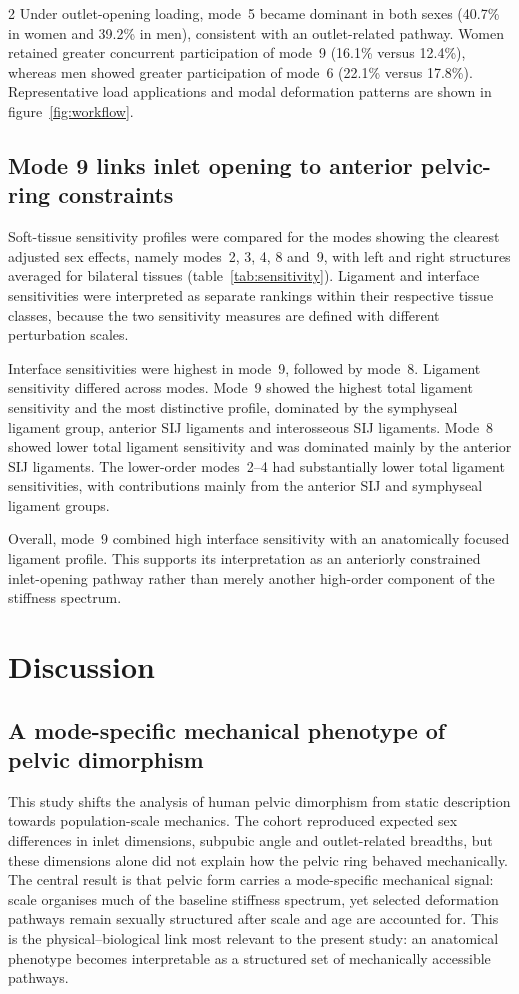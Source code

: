 \documentclass[openacc]{rsproca_new}
\begin{document}
\begin{multicols}{2}
Under outlet-opening loading, mode~5 became dominant in both sexes (40.7\% in women and 39.2\% in men), consistent with an outlet-related pathway. Women retained greater concurrent participation of mode~9 (16.1\% versus 12.4\%), whereas men showed greater participation of mode~6 (22.1\% versus 17.8\%). Representative load applications and modal deformation patterns are shown in figure~\ref{fig:workflow}.

\subsection{Mode 9 links inlet opening to anterior pelvic-ring constraints}

Soft-tissue sensitivity profiles were compared for the modes showing the clearest adjusted sex effects, namely modes~2, 3, 4, 8 and~9, with left and right structures averaged for bilateral tissues (table~\ref{tab:sensitivity}). Ligament and interface sensitivities were interpreted as separate rankings within their respective tissue classes, because the two sensitivity measures are defined with different perturbation scales.

Interface sensitivities were highest in mode~9, followed by mode~8. Ligament sensitivity differed across modes. Mode~9 showed the highest total ligament sensitivity and the most distinctive profile, dominated by the symphyseal ligament group, anterior SIJ ligaments and interosseous SIJ ligaments. Mode~8 showed lower total ligament sensitivity and was dominated mainly by the anterior SIJ ligaments. The lower-order modes~2--4 had substantially lower total ligament sensitivities, with contributions mainly from the anterior SIJ and symphyseal ligament groups.

Overall, mode~9 combined high interface sensitivity with an anatomically focused ligament profile. This supports its interpretation as an anteriorly constrained inlet-opening pathway rather than merely another high-order component of the stiffness spectrum.

\section{Discussion}
\subsection{A mode-specific mechanical phenotype of pelvic dimorphism}

This study shifts the analysis of human pelvic dimorphism from static description towards population-scale mechanics. The cohort reproduced expected sex differences in inlet dimensions, subpubic angle and outlet-related breadths, but these dimensions alone did not explain how the pelvic ring behaved mechanically. The central result is that pelvic form carries a mode-specific mechanical signal: scale organises much of the baseline stiffness spectrum, yet selected deformation pathways remain sexually structured after scale and age are accounted for. This is the physical--biological link most relevant to the present study: an anatomical phenotype becomes interpretable as a structured set of mechanically accessible pathways.


\end{multicols}
\end{document}
